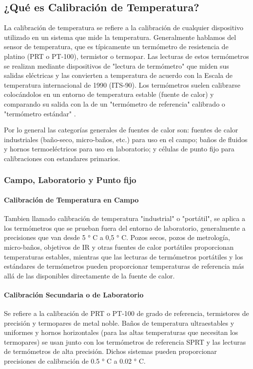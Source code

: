 \subsection{¿Qué es Calibración de Temperatura?}

\par 
La calibración de temperatura se refiere a la calibración de cualquier dispositivo utilizado en un sistema que mide la temperatura. Generalmente hablamos del sensor de temperatura, que es típicamente un termómetro de resistencia de platino (PRT o PT-100), termistor o termopar. Las lecturas de estos termómetros se realizan mediante dispositivos de "lectura de termómetro" que miden sus salidas eléctricas y las convierten a temperatura de acuerdo con la Escala de temperatura internacional de 1990 (ITS-90).
Los termómetros suelen calibrarse colocándolos en un entorno de temperatura estable (fuente de calor) y comparando su salida con la de un "termómetro de referencia" calibrado o "termómetro estándar" \cite{temperatura-fluke}. 

\par \noindent
Por lo general las categorías generales de fuentes de calor son: fuentes de calor industriales (baño-seco, micro-baños, etc.) para uso en el campo; baños de fluidos y hornos termoeléctricos para uso en laboratorio; y células de punto fijo para calibraciones con estandares primarios.

\subsubsection{Campo, Laboratorio y Punto fijo \cite{temperatura-fluke}}

\paragraph{Calibración de Temperatura en Campo}
Tambien llamado calibración de temperatura "industrial" o "portátil", se aplica a los termómetros que se prueban fuera del entorno de laboratorio, generalmente a precisiones que van desde 5 ° C a 0,5 ° C. Pozos secos, pozos de metrología, micro-baños, objetivos de IR y otras fuentes de calor portátiles proporcionan temperaturas estables, mientras que las lecturas de termómetros portátiles y los estándares de termómetros pueden proporcionar temperaturas de referencia más allá de las disponibles directamente de la fuente de calor.

\paragraph{Calibración Secundaria o de Laboratorio}
Se refiere a la calibración de PRT o PT-100 de grado de referencia, termistores de precisión y termopares de metal noble. Baños de temperatura ultraestables y uniformes y hornos horizontales (para las altas temperaturas que necesitan los termopares) se usan junto con los termómetros de referencia SPRT y las lecturas de termómetros de alta precisión. Dichos sistemas pueden proporcionar precisiones de calibración de 0.5 ° C a 0.02 ° C.

